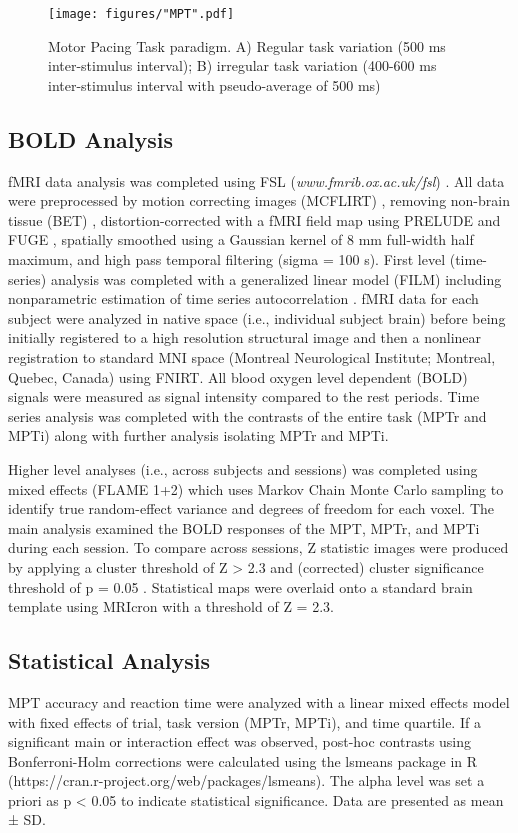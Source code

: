 \begin{figure}
	\centering
	\texttt{[image: figures/"MPT".pdf]}
	\caption{Motor Pacing Task paradigm. A) Regular task variation (500 ms inter-stimulus interval); B) irregular task variation (400-600 ms inter-stimulus interval with pseudo-average of 500 ms)}
	\label{fig:mpt}	
\end{figure}

\subsection{BOLD Analysis}
fMRI data analysis was completed using FSL (\textit{www.fmrib.ox.ac.uk/fsl}) \cite{smith_advances_2004}. All data were preprocessed by motion correcting images (MCFLIRT) \cite{jenkinson_improved_2002}, removing non-brain tissue (BET) \cite{smith_fast_2002}, distortion-corrected with a fMRI field map using PRELUDE and FUGE \cite{smith_advances_2004}, spatially smoothed using a Gaussian kernel of 8 mm full-width half maximum, and high pass temporal filtering (sigma = 100 s). First level (time-series) analysis was completed with a generalized linear model (FILM) including nonparametric estimation of time series autocorrelation \cite{woolrich_temporal_2001}. fMRI data for each subject were analyzed in native space (i.e., individual subject brain) before being initially registered to a high resolution structural image and then a nonlinear registration to standard MNI space (Montreal Neurological Institute; Montreal, Quebec, Canada) using FNIRT. All blood oxygen level dependent (BOLD) signals were measured as signal intensity compared to the rest periods. Time series analysis was completed with the contrasts of the entire task (MPTr and MPTi) along with further analysis isolating MPTr and MPTi.

Higher level analyses (i.e., across subjects and sessions) was completed using mixed effects (FLAME 1+2) which uses Markov Chain Monte Carlo sampling to identify true random-effect variance and degrees of freedom for each voxel. The main analysis examined the BOLD responses of the MPT, MPTr, and MPTi during each session. To compare across sessions, Z statistic images were produced by applying a cluster threshold of Z > 2.3 and (corrected) cluster significance threshold of p = 0.05 \cite{worsley_three-dimensional_1992}. Statistical maps were overlaid onto a standard brain template using MRIcron \cite{rorden_improving_2007} with a threshold of Z = 2.3.

\subsection{Statistical Analysis}
MPT accuracy and reaction time were analyzed with a linear mixed effects model with fixed effects of trial, task version (MPTr, MPTi), and time quartile. If a significant main or interaction effect was observed, post-hoc contrasts using Bonferroni-Holm corrections were calculated using the lsmeans package in R (https://cran.r-project.org/web/packages/lsmeans). The alpha level was set a priori as p < 0.05 to indicate statistical significance. Data are presented as mean ± SD.

